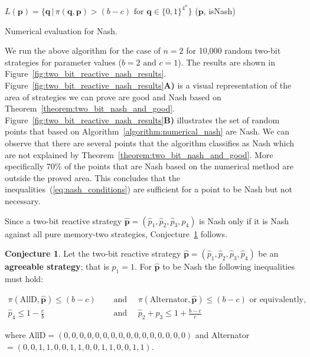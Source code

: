 \documentclass{article}
\theoremstyle{definition}
\newtheorem{conjecture}[theorem]{Conjecture}
\begin{document}
\begin{algorithm}[H]
   $L(\mathbf{p}) = \{\mathbf{q} \,|\, \pi({\mathbf{q}}, \mathbf{p}) > (b - c) \text{ for } \mathbf{q}  \in \{0, 1\}^{4 ^ n}\}$\;
  \Return (\(\mathbf{p}\), isNash) \;
  \caption{Numerical evaluation for Nash.}\label{algorithm:numerical_nash}
\end{algorithm}

We run the above algorithm for the case of \(n=2\) for 10,000 random two-bit strategies for
parameter values (\(b=2 \text{ and } c=1\)). The results are shown in
Figure~\ref{fig:two_bit_reactive_nash_results}.
Figure~\ref{fig:two_bit_reactive_nash_results}\textbf{A)} is a visual
representation of the area of strategies we can prove are good and Nash based on
Theorem~\ref{theorem:two_bit_nash_and_good}.
Figure~\ref{fig:two_bit_reactive_nash_results}\textbf{B)} illustrates the set of
random points that based on Algorithm~\ref{algorithm:numerical_nash} are Nash.
We can observe that there are several points that the algorithm classifies as
Nash which are not explained by Theorem~\ref{theorem:two_bit_nash_and_good}.
More specifically 70\% of the points that are Nash based on the numerical method
are outside the proved area. This concludes that the
inequalities~(\ref{eq:nash_conditions}) are sufficient for a point to be Nash
but not necessary.

Since a two-bit reactive strategy \(\mathbf{\hat{p}} = (\hat{p}_{1},
\hat{p}_{2}, \hat{p}_{3}, \hat{p}_{4})\) is Nash only if it is Nash against all
pure memory-two strategies,
Conjecture~\ref{conjecture:nash_from_numerical_results} follows.

\begin{conjecture}\label{conjecture:nash_from_numerical_results}
Let the two-bit reactive strategy \(\mathbf{\hat{p}} = (\hat{p}_{1}, \hat{p}_{2}, \hat{p}_{3}, \hat{p}_{4})\) be an \textbf{agreeable
strategy}; that is \(\hat{p}_1 = 1\). For \(\mathbf{\hat{p}}\) to be Nash the
following inequalities must hold:

\begin{align*}
  \pi(\text{AllD}, \mathbf{\hat{p}}) \leq (b - c) & \quad \text{ and } \quad \pi(\text{Alternator}, \mathbf{\hat{p}}) \leq (b - c) \text{ or equivalently,} \\
  \hat{p}_4 \leq 1 - \frac{c}{b} & \quad \text{ and } \quad  \hat{p}_2 + \hat{p}_3 \leq 1 + \frac{b - c}{c}
\end{align*}

where AllD\(=(0, 0, 0, 0, 0, 0, 0, 0, 0, 0, 0, 0, 0, 0, 0, 0)\) and
Alternator\(=(0, 0, 1, 1, 0, 0, 1, 1, 0, 0, 1, 1, 0, 0, 1, 1)\).
\end{conjecture}
\end{document}
